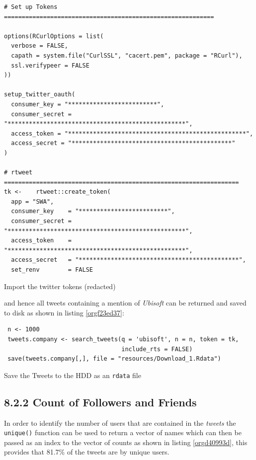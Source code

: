 \documentclass[11pt]{article}
\begin{document}
\begin{listing}[htbp]
\begin{verbatim}
# Set up Tokens ===========================================================

options(RCurlOptions = list(
  verbose = FALSE,
  capath = system.file("CurlSSL", "cacert.pem", package = "RCurl"),
  ssl.verifypeer = FALSE
))

setup_twitter_oauth(
  consumer_key = "*************************",
  consumer_secret = "**************************************************",
  access_token = "**************************************************",
  access_secret = "*********************************************"
)

# rtweet ==================================================================
tk <-    rtweet::create_token(
  app = "SWA",
  consumer_key    = "*************************",
  consumer_secret = "**************************************************",
  access_token    = "**************************************************",
  access_secret   = "*********************************************",
  set_renv        = FALSE
\end{verbatim}
\caption{\label{org113e1ba}Import the twitter tokens (redacted)}
\end{listing}

and hence all tweets containing a mention of \emph{Ubisoft} can be returned and saved to disk as shown in listing \ref{orgf23ed37}:

\begin{listing}[htbp]
\begin{verbatim}
 n <- 1000
 tweets.company <- search_tweets(q = 'ubisoft', n = n, token = tk,
                                 include_rts = FALSE)
 save(tweets.company[,], file = "resources/Download_1.Rdata")
\end{verbatim}
\caption{\label{orgf23ed37}Save the Tweets to the HDD as an \texttt{rdata} file}
\end{listing}

\subsection{8.2.2 Count of Followers and Friends}
\label{sec:org2cbea10}
In order to identify the number of users that are contained in the \emph{tweets} the
\texttt{unique()} function can be used to return a vector of names which can then be passed as an index to the vector of counts as shown in listing \ref{orgd40993d}, this provides that 81.7\% of the tweets are by unique users.
\end{document}

